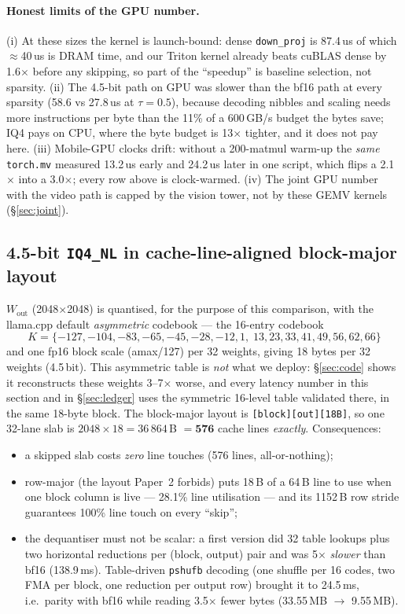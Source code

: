 \documentclass[11pt]{article}
\newcommand{\Wout}{\ensuremath{W_{\mathrm{out}}}}
\newcommand{\code}[1]{\texttt{\small #1}}
\begin{document}
\paragraph{Honest limits of the GPU number.} (i) At these sizes the kernel is launch-bound:
dense \code{down\_proj} is 87.4\,us of which $\approx$40\,us is DRAM time, and our Triton
kernel already beats cuBLAS dense by 1.6$\times$ before any skipping, so part of the
``speedup'' is baseline selection, not sparsity. (ii) The 4.5-bit path on GPU was slower
than the bf16 path at every sparsity (58.6 vs 27.8\,us at $\tau{=}0.5$), because decoding
nibbles and scaling needs more instructions per byte than the 11\% of a 600\,GB/s budget
the bytes save; IQ4 pays on CPU, where the byte budget is 13$\times$ tighter, and it does
not pay here. (iii) Mobile-GPU clocks drift: without a 200-matmul warm-up the \emph{same}
\code{torch.mv} measured 13.2\,us early and 24.2\,us later in one script, which flips a
2.1$\times$ into a 3.0$\times$; every row above is clock-warmed. (iv) The joint GPU number
with the video path is capped by the vision tower, not by these GEMV kernels
(\S\ref{sec:joint}).

\subsection{4.5-bit \code{IQ4\_NL} in cache-line-aligned block-major layout}
\Wout{} (2048$\times$2048) is quantised, for the purpose of this comparison, with the llama.cpp default
\emph{asymmetric} codebook --- the 16-entry codebook
\begin{equation}
K=\{-127,-104,-83,-65,-45,-28,-12,1,\;13,23,33,41,49,56,62,66\}
\end{equation}
and one fp16 block scale
(amax/127) per 32 weights, giving 18 bytes per 32 weights (4.5\,bit). This asymmetric table
is \emph{not} what we deploy: \S\ref{sec:code} shows it reconstructs these weights 3--7$\times$
worse, and every latency number in this section and in \S\ref{sec:ledger} uses the
symmetric 16-level table validated there, in the same 18-byte block. The block-major
layout is \code{[block][out][18B]}, so one 32-lane slab is
$2048\times18 = 36\,864$\,B $= \mathbf{576}$ cache lines \emph{exactly}. Consequences:
\begin{itemize}
\item a skipped slab costs \emph{zero} line touches (576 lines, all-or-nothing);
\item row-major (the layout Paper~2 forbids) puts 18\,B of a 64\,B line to use when one
block column is live --- 28.1\% line utilisation --- and its 1152\,B row stride guarantees
100\% line touch on every ``skip'';
\item the dequantiser must not be scalar: a first version did 32 table lookups plus two
horizontal reductions per (block, output) pair and was 5$\times$ \emph{slower} than bf16
(138.9\,ms). Table-driven \code{pshufb} decoding (one shuffle per 16 codes, two FMA per
block, one reduction per output row) brought it to 24.5\,ms, i.e.\ parity with bf16 while
reading 3.5$\times$ fewer bytes (33.55\,MB $\rightarrow$ 9.55\,MB).
\end{itemize}
\end{document}
